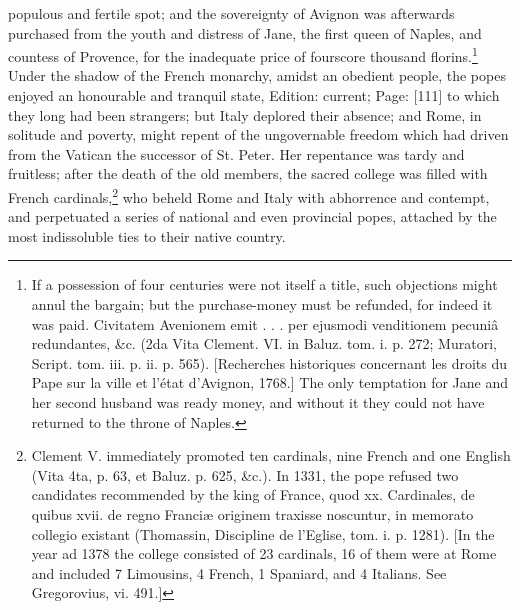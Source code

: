 populous and fertile spot; and the sovereignty of Avignon was afterwards purchased from the youth and distress of Jane, the first queen of Naples, and countess of Provence, for the inadequate price of fourscore thousand florins.\footnote{If a possession of four centuries were not itself a title, such objections might annul the bargain; but the purchase-money must be refunded, for indeed it was paid. Civitatem Avenionem emit . . . per ejusmodi venditionem pecuniâ redundantes, \&c. (2da Vita Clement. VI. in Baluz. tom. i. p. 272; Muratori, Script. tom. iii. p. ii. p. 565). [Recherches historiques concernant les droits du Pape sur la ville et l\texthebrew{}’état d\texthebrew{}’Avignon, 1768.] The only temptation for Jane and her second husband was ready money, and without it they could not have returned to the throne of Naples.} Under the shadow of the French monarchy, amidst an obedient people, the popes enjoyed an honourable and tranquil state, Edition: current; Page: [111] to which they long had been strangers; but Italy deplored their absence; and Rome, in solitude and poverty, might repent of the ungovernable freedom which had driven from the Vatican the successor of St. Peter. Her repentance was tardy and fruitless; after the death of the old members, the sacred college was filled with French cardinals,\footnote{Clement V. immediately promoted ten cardinals, nine French and one English (Vita 4ta, p. 63, et Baluz. p. 625, \&c.). In 1331, the pope refused two candidates recommended by the king of France, quod xx. Cardinales, de quibus xvii. de regno Franciæ originem traxisse noscuntur, in memorato collegio existant (Thomassin, Discipline de l\texthebrew{}’Eglise, tom. i. p. 1281). [In the year ad 1378 the college consisted of 23 cardinals, 16 of them were at Rome and included 7 Limousins, 4 French, 1 Spaniard, and 4 Italians. See Gregorovius, vi. 491.]} who beheld Rome and Italy with abhorrence and contempt, and perpetuated a series of national and even provincial popes, attached by the most indissoluble ties to their native country.

